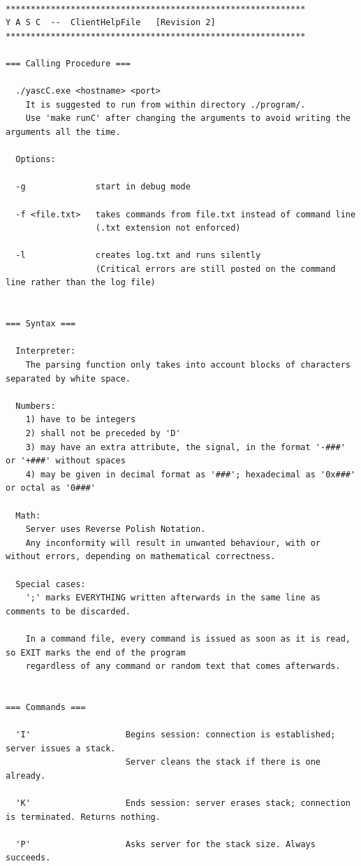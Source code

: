 \begin{lstlisting}

************************************************************
Y A S C  --  ClientHelpFile   [Revision 2]
************************************************************

=== Calling Procedure ===

  ./yascC.exe <hostname> <port>
    It is suggested to run from within directory ./program/.
    Use 'make runC' after changing the arguments to avoid writing the arguments all the time.

  Options:

  -g              start in debug mode

  -f <file.txt>   takes commands from file.txt instead of command line
                  (.txt extension not enforced)

  -l              creates log.txt and runs silently
                  (Critical errors are still posted on the command line rather than the log file)


=== Syntax ===

  Interpreter:
    The parsing function only takes into account blocks of characters separated by white space.

  Numbers:
    1) have to be integers
    2) shall not be preceded by 'D'
    3) may have an extra attribute, the signal, in the format '-###' or '+###' without spaces
    4) may be given in decimal format as '###'; hexadecimal as '0x###' or octal as '0###'

  Math:
    Server uses Reverse Polish Notation.
    Any inconformity will result in unwanted behaviour, with or without errors, depending on mathematical correctness.

  Special cases:
    ';' marks EVERYTHING written afterwards in the same line as comments to be discarded.

    In a command file, every command is issued as soon as it is read, so EXIT marks the end of the program
    regardless of any command or random text that comes afterwards.


=== Commands ===

  'I'                   Begins session: connection is established; server issues a stack.
                        Server cleans the stack if there is one already.

  'K'                   Ends session: server erases stack; connection is terminated. Returns nothing.

  'P'                   Asks server for the stack size. Always succeeds.


\end{lstlisting}
